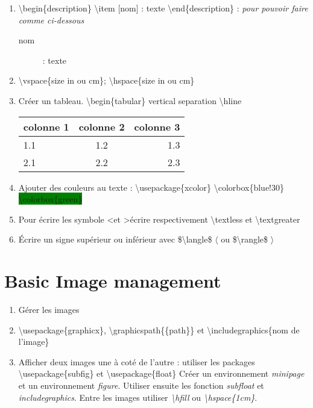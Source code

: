\documentclass[12pt, letterpaper]{article}
\begin{document}
\begin{enumerate}
\item \textbackslash begin\{description\} \textbackslash item [nom] : texte \textbackslash end\{description\} : \textit{pour pouvoir faire comme ci-dessous}
\begin{description}
\item [nom] : texte
\end{description}
\item \textbackslash vspace\{size in ou cm\}; \textbackslash hspace\{size in ou cm\}
\item Créer un tableau. \textbackslash begin\{tabular\} vertical separation \textbackslash hline
\newline \begin{tabular}{|l|c|r|}
  \hline
  colonne 1 & colonne 2 & colonne 3 \\
  \hline
  1.1 & 1.2 & 1.3 \\ \hline
  2.1 & 2.2 & 2.3 \\
  \hline
\end{tabular}
\item Ajouter des couleurs au texte : \textbackslash usepackage\{xcolor\}
\newline \colorbox{blue!30}{\textbackslash colorbox\{blue!30\}}
\newline \colorbox{green}{\textbackslash colorbox\{green\}}
\item Pour écrire les symbole \textless et \textgreater écrire respectivement \textbackslash textless et \textbackslash textgreater
\item Écrire un signe supérieur ou inférieur avec \$\textbackslash langle\$ $\langle$ ou \$\textbackslash rangle\$ $\rangle$
\end{enumerate}

\section{Basic Image management}
\begin{enumerate}
\item Gérer les images
\item \textbackslash usepackage\{graphicx\}, \textbackslash graphicspath\{\{path\}\} et \textbackslash includegraphics\{nom de l'image\}
\item Afficher deux images une à coté de l'autre : utiliser les packages \textbackslash usepackage\{subfig\} et \textbackslash usepackage\{float\}
\newline Créer un environnement \textit{minipage} et un environnement \textit{figure}. Utiliser ensuite les fonction \textit{subfloat} et \textit{includegraphics}. Entre les images utiliser \textit{\textbackslash hfill} ou \textit{\textbackslash hspace\{1cm\}}.
\end{enumerate}
\begin{minipage}{\linewidth}
  \begin{figure}[H]
  \centering
    \hspace{1cm}
  \end{figure}
\end{minipage}
\end{document}
